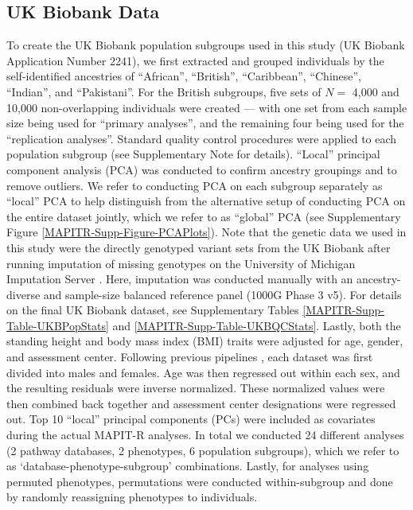 \documentclass[10pt]{article}
\begin{document}
\subsection*{UK Biobank Data} 

To create the UK Biobank population subgroups used in this study (UK Biobank Application Number 2241), we first extracted and grouped individuals by the self-identified ancestries of ``African'', ``British'', ``Caribbean'', ``Chinese'', ``Indian'', and ``Pakistani''. For the British subgroups, five sets of $N =$ 4,000 and 10,000 non-overlapping individuals were created --- with one set from each sample size being used for ``primary analyses'', and the remaining four being used for the ``replication analyses''. Standard quality control procedures were applied to each population subgroup (see Supplementary Note for details). ``Local'' principal component analysis (PCA) was conducted to confirm ancestry groupings and to remove outliers. We refer to conducting PCA on each subgroup separately as ``local'' PCA to help distinguish from the alternative setup of conducting PCA on the entire dataset jointly, which we refer to as ``global'' PCA (see Supplementary Figure \ref{MAPITR-Supp-Figure-PCAPlots}). Note that the genetic data we used in this study were the directly genotyped variant sets from the UK Biobank after running imputation of missing genotypes on the University of Michigan Imputation Server \cite{Das2016}. Here, imputation was conducted manually with an ancestry-diverse and sample-size balanced reference panel (1000G Phase 3 v5). For details on the final UK Biobank dataset, see Supplementary Tables \ref{MAPITR-Supp-Table-UKBPopStats} and \ref{MAPITR-Supp-Table-UKBQCStats}. Lastly, both the standing height and body mass index (BMI) traits were adjusted for age, gender, and assessment center. Following previous pipelines \cite{Wood2014a,Locke2015}, each dataset was first divided into males and females. Age was then regressed out within each sex, and the resulting residuals were inverse normalized. These normalized values were then combined back together and assessment center designations were regressed out. Top 10 ``local'' principal components (PCs) were included as covariates during the actual MAPIT-R analyses. In total we conducted 24 different analyses (2 pathway databases, 2 phenotypes, 6 population subgroups), which we refer to as `database-phenotype-subgroup' combinations. Lastly, for analyses using permuted phenotypes, permutations were conducted within-subgroup and done by randomly reassigning phenotypes to individuals.
\end{document}

